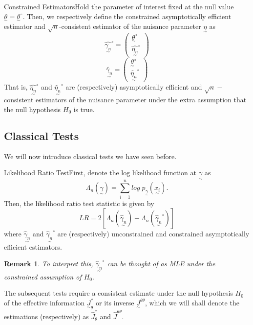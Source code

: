 \documentclass[twoside]{article}
\newtheorem{remark}[theorem]{Remark}
\newcommand{\utilde}{\underset{\sim}}
\begin{document}
\begin{definition_exam}{Constrained Estimators}{}Hold the parameter of interest fixed at the null value $\utilde{\theta} = \utilde{\theta}^{\circ}.$ Then, we respectively define the constrained asymptotically efficient estimator and $\sqrt{n}$-consistent estimator of the nuisance parameter $\utilde{\eta}$ as 
$$
\hat{\utilde{\gamma_n}}^{\circ} = 
\begin{pmatrix}
\utilde{\theta}^{\circ}\\
\hat{\utilde{\eta_n}}^{\circ}
\end{pmatrix}
$$
$$
\tilde{\utilde{\gamma_n}} = 
\begin{pmatrix}
\utilde{\theta}^{\circ}\\
\tilde{\utilde{\eta_n}}^{\circ}
\end{pmatrix}
$$
That is, $\hat{\utilde{\eta_n}}^{\circ}$ and $\tilde{\utilde{\eta_n}}^{\circ}$ are (respectively) asymptotically efficient and $\sqrt{n}-$consistent estimators of the nuisance parameter under the extra assumption that the null hypothesis $H_0$ is true.
\end{definition_exam}


\subsection{Classical Tests}
We will now introduce classical tests we have seen before.

\begin{definition_exam}{Likelihood Ratio Test}{}First, denote the log likelihood function at $\utilde{\gamma}$ as 
$$
\Lambda_n(\utilde{\gamma}) = \sum_{i=1}^{n}log \; p_{ \utilde{\gamma}}(\utilde{x_i}).$$
Then, the likelihood ratio test statistic is given by 
$$
LR = 2[\Lambda_n(\utilde{\hat{\gamma}_n}) - \Lambda_n(\utilde{\hat{\gamma}_n}^{\circ})]
$$
where $\utilde{\hat{\gamma}_n}$ and $\utilde{\hat{\gamma}_n}^{\circ}$ are (respectively) unconstrained and constrained asymptotically efficient estimators.
\end{definition_exam}

\begin{remark}To interpret this, $\utilde{\hat{\gamma}_n}^{\circ}$ can be thought of as MLE under the constrained assumption of $H_0.$
\end{remark}

The subsequent tests require a consistent estimate under the null hypothesis $H_0$ of the effective information $\utilde{J}_{\theta}^{*}$ or its inverse $\utilde{J}^{\theta \theta}$, which we will shall denote the estimations (respectively) as $\hat{J}_{\theta}^{*}$ and $\hat{J}^{\theta \theta}.$
\end{document}
